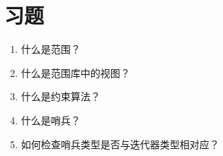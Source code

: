 \section{习题}
\begin{enumerate}
  \item 什么是范围？
  \item 什么是范围库中的视图？
  \item 什么是约束算法？
  \item 什么是哨兵？
  \item 如何检查哨兵类型是否与迭代器类型相对应？
\end{enumerate}